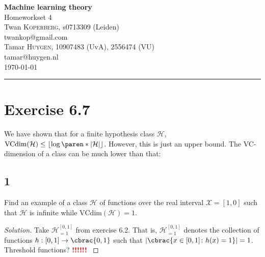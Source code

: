 \documentclass[10pt, a4paper, twoside]{amsart}
\makeatletter
\theoremstyle{plain}
\DeclarePairedDelimiter\abs{\lvert}{\rvert}
\DeclarePairedDelimiter\cbrac\{\}
\DeclarePairedDelimiter\paren()
\renewcommand{\c}{\ensuremath{\colon}}
\newcommand{\cH}{\ensuremath{\mathcal{H}}}
\newcommand{\cX}{\ensuremath{\mathcal{X}}}
\newenvironment{solution}
               {\let\oldqedsymbol=\qedsymbol
                \renewcommand{\qedsymbol}{$\blacktriangleleft$}
                \begin{proof}[Solution]}
               {\end{proof}
                \renewcommand{\qedsymbol}{\oldqedsymbol}}
\newcommand{\TODO}{\textcolor{red}{\textbf{!!!!!! }}}
\newcommand{\firstName}  {Twan}
\newcommand{\lastName}   {Koperberg}
\newcommand{\studId}     {0713309 (Leiden)}
\renewcommand{\email}    {twankop@gmail.com}
\newcommand{\firstNameII}  {Tamar}
\newcommand{\lastNameII}   {Huygen}
\newcommand{\studIdII}     {10907483 (UvA)}
\newcommand{\studIdIII}    {2556474 (VU)}
\newcommand{\emailII}     {tamar@huygen.nl}
\makeatother
\begin{document}
\begin{center}

  {\huge\bf Machine learning theory}\\
  {\large\sc Homeworkset 4 }\\ \vspace{1em}
  \firstName \textsc{ \lastName}, {\sc s}\studId \\
  \email\text{}\\ \smallskip
  \firstNameII \textsc{ \lastNameII}, \studIdII, \studIdIII\\
  \emailII \\ \bigskip
  \today \\\bigskip
  \hrule
  \bigskip
 \end{center}

 \section*{Exercise 6.7}
 We have shown that for a finite hypothesis class $\cH$, $\text{VCdim}(\cH) \leq \left\lfloor \log \paren*{\abs{\cH}} \right\rfloor$. However, this is just an upper bound. The VC-dimension of a class can be much lower than that:
 \subsection*{1}
 Find an example of a class $\cH$ of functions over the real interval $\cX = [1,0]$ such that $\cH$ is infinite while $\text{VCdim}(\cH) = 1$.
\begin{solution}
 Take $\cH_{=1}^{[0,1]}$ from exercise 6.2. That is, $\cH_{=1}^{[0,1]}$ denotes the collection of functions 
 $h:[0,1]\to \cbrac{0,1}$ such that $\abs{\cbrac{x \in [0,1] \c h(x)=1}}=1$.\\
   Threshold functions?
 \TODO
\end{solution}
\end{document}
